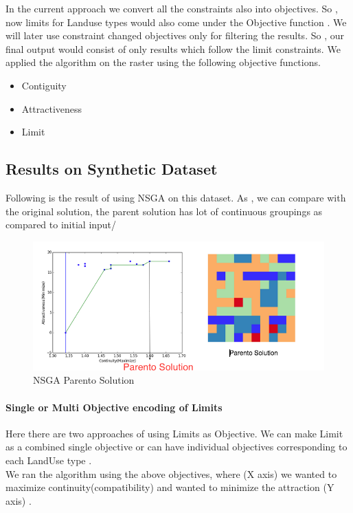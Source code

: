 \documentclass[12pt]{article} %
\begin{document}
In the current approach we convert all the constraints also into objectives. So , now limits  for Landuse types would also come under the Objective function . We will later use constraint changed objectives only for filtering the results. So , our final output would consist of only results which follow the limit constraints.
We applied the algorithm  on the raster using the following objective functions. \\
\begin{itemize}
\item Contiguity
\item Attractiveness
\item Limit
\end{itemize}
\subsection{Results on Synthetic Dataset}
Following is the result of using NSGA on this dataset. As , we can compare with the original solution, the parent solution has lot of continuous groupings as compared to initial input/\\ 
\begin{figure}[h]
\begin{center}
\includegraphics[width=5.5in]{res1.png}
\caption{NSGA Parento Solution}
\end{center}
\end{figure}

\paragraph{Single or Multi Objective encoding of Limits\\}

Here there are two approaches of using Limits as Objective. We can make Limit as a combined single objective or can have individual objectives corresponding to each LandUse type . \\
We ran the algorithm using the above objectives, where (X axis) we wanted to maximize continuity(compatibility) and wanted to minimize the attraction (Y axis) .\\
\end{document}
